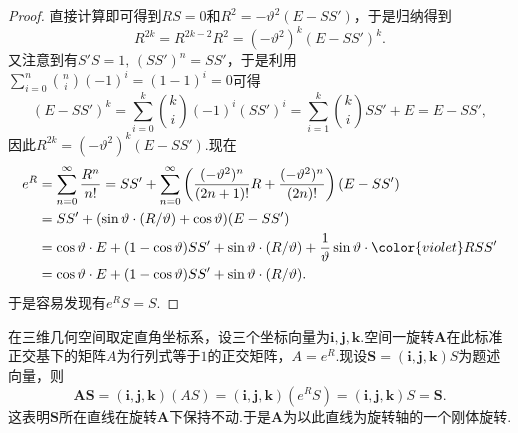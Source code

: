 \begin{proof}
	直接计算即可得到$RS=0$和$R^2=-\vartheta^2(E-SS')$，于是归纳得到
	\[
		R^{2k}=R^{2k-2}R^2=(-\vartheta^2)^k(E-SS')^k.
	\]
	又注意到有$S'S=1,\,(SS')^n=SS'$，于是利用$\displaystyle\sum_{i=0}^{n}\binom{n}{i}(-1)^i=(1-1)^i=0$可得
	\[
		(E-SS')^k=\sum_{i=0}^{k}\binom{k}{i}(-1)^i(SS')^i=\sum_{i=1}^{k}\binom{k}{i}SS'+E=E-SS',
	\]
	因此$R^{2k}=(-\vartheta^2)^k(E-SS')$.现在
	\begin{align*}
		e^R & =\sum_{n=0}^{\infty}\frac{R^n}{n!}=SS'+\sum_{n=0}^{\infty}\left(\frac{(-\vartheta^2)^n}{(2n+1)!}R+\frac{(-\vartheta^2)^n}{(2n)!}\right)(E-SS') \\
		    & =SS'+(\sin\vartheta\cdot(R/\vartheta)+\cos\vartheta)(E-SS')                                                                                    \\
		    & =\cos\vartheta\cdot E+(1-\cos\vartheta)SS'+\sin\vartheta\cdot(R/\vartheta)+\frac{1}{\vartheta}\sin\vartheta\cdot {\color{violet}RS}S'          \\
		    & =\cos\vartheta\cdot E+(1-\cos\vartheta)SS'+\sin\vartheta\cdot(R/\vartheta).
	\end{align*}
	于是容易发现有$e^RS=S$.
\end{proof}
\begin{note}
	在三维几何空间取定直角坐标系，设三个坐标向量为$\bm i,\bm j,\bm k$.空间一旋转$\bm A$在此标准正交基下的矩阵$A$为行列式等于$1$的正交矩阵，$A=e^R$.现设$\bm S=(\bm i,\bm j,\bm k)S$为题述向量，则
	\[
		\bm{AS}=(\bm i,\bm j,\bm k)(AS)=(\bm i,\bm j,\bm k)(e^RS)=(\bm i,\bm j,\bm k)S=\bm S.
	\]
	这表明$\bm S$所在直线在旋转$\bm A$下保持不动.于是$\bm A$为以此直线为旋转轴的一个刚体旋转.
\end{note}